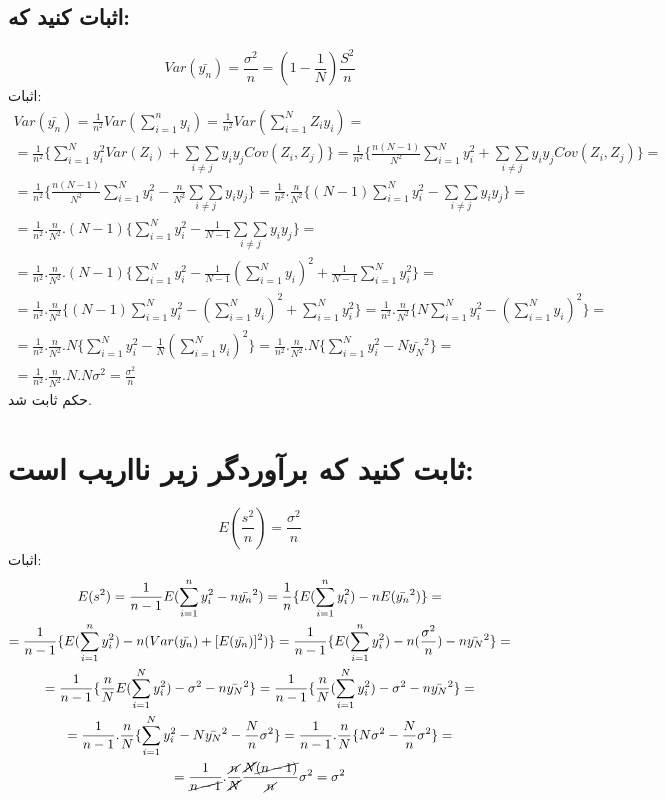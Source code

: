 \subsection*{اثبات کنید که:}
\begin{equation*}
	Var(\bar{y_n})=\frac{\sigma ^2}{n}=(1-\frac{1}{N})\frac{S^2}{n}
\end{equation*}
اثبات:
\begin{multline*}
	Var(\bar{y_n})=\frac{1}{n^2}Var(\sum_{i=1}^{n}y_i)=\frac{1}{n^2}Var(\sum_{i=1}^{N}Z_iy_i)
	=\\=
	\frac{1}{n^2}\{\sum_{i=1}^{N}y_i^2Var(Z_i)+\underset{i\neq j}{\sum\sum }y_iy_jCov(Z_i,Z_j) \}
	=\frac{1}{n^2}\{\frac{n(N-1)}{N^2}\sum_{i=1}^{N}y_i^2+\underset{i\neq j}{\sum\sum }y_iy_jCov(Z_i,Z_j) \}
	=\\=
	\frac{1}{n^2}\{\frac{n(N-1)}{N^2}\sum_{i=1}^{N}y_i^2-\frac{n}{N^2}\underset{i\neq j}{\sum\sum }y_iy_j \}
	=\frac{1}{n^2}.\frac{n}{N^2}\{(N-1)\sum_{i=1}^{N}y_i^2-\underset{i\neq j}{\sum\sum }y_iy_j \}
	=\\=
	\frac{1}{n^2}.\frac{n}{N^2}.(N-1)\{\sum_{i=1}^{N}y_i^2-\frac{1}{N-1}\underset{i\neq j}{\sum\sum }y_iy_j \}
	=\\=
	\frac{1}{n^2}.\frac{n}{N^2}.(N-1)\{\sum_{i=1}^{N}y_i^2-\frac{1}{N-1}(\sum_{i=1}^{N}y_i)^2+\frac{1}{N-1}\sum_{i=1}^{N}y_i^2 \}
	=\\=
	\frac{1}{n^2}.\frac{n}{N^2}\{(N-1)\sum_{i=1}^{N}y_i^2-(\sum_{i=1}^{N}y_i)^2+\sum_{i=1}^{N}y_i^2 \}
	=\frac{1}{n^2}.\frac{n}{N^2}\{N\sum_{i=1}^{N}y_i^2-(\sum_{i=1}^{N}y_i)^2 \}
	=\\=
	\frac{1}{n^2}.\frac{n}{N^2}.N\{\sum_{i=1}^{N}y_i^2-\frac{1}{N}(\sum_{i=1}^{N}y_i)^2 \}
	=\frac{1}{n^2}.\frac{n}{N^2}.N\{\sum_{i=1}^{N}y_i^2-N\bar{y_N}^2 \}
	=\\=
	\frac{1}{n^2}.\frac{n}{N^2}.N.N\sigma ^2 
	=\frac{\sigma^2}{n}
\end{multline*}
حکم ثابت شد.
\section*{ثابت کنید که برآوردگر زیر نااریب است:}
\begin{equation*}
	E(\frac{s^2}{n})=\frac{\sigma^2}{n}
\end{equation*}
اثبات:
\begin{multline*}
	E(s^2)=\frac{1}{n-1}E(\sum_{i=1}^{n}y_i^2-n\bar{y_n}^2)
	=\frac{1}{n}\{E(\sum_{i=1}^{n}y_i^2)-nE(\bar{y_n}^2)\}
	=\\=
	\frac{1}{n-1}\{E(\sum_{i=1}^{n}y_i^2) -n(Var(\bar{y_n})+[E(\bar{y_n})]^2)\}
	=\frac{1}{n-1}\{E(\sum_{i=1}^{n}y_i^2) -n(\frac{\sigma^2}{n})-n\bar{y_N}^2\}
	=\\=
	\frac{1}{n-1}\{\frac{n}{N}E(\sum_{i=1}^{N}y_i^2) -\sigma^2-n\bar{y_N}^2\}
	=\frac{1}{n-1}\{\frac{n}{N}(\sum_{i=1}^{N}y_i^2) -\sigma^2-n\bar{y_N}^2\}
	=\\=
	\frac{1}{n-1}.\frac{n}{N}\{\sum_{i=1}^{N}y_i^2-N\bar{y_N}^2 -\frac{N}{n}\sigma^2\}
	=\frac{1}{n-1}.\frac{n}{N}\{N\sigma ^ 2-\frac{N}{n}\sigma^2\}
	=\\=
	\frac{1}{\cancel{n-1}}.\frac{\cancel{n}}{\cancel{N}}\frac{\cancel{N}\cancel{(n-1)}}{\cancel{n}}\sigma^2
	=\sigma^2
\end{multline*}
